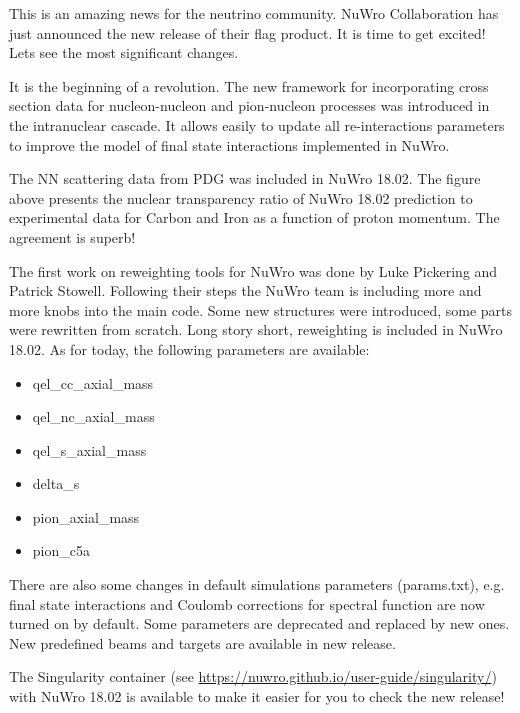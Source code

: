 \documentclass{article}
\begin{document}
\begin{multicols}{3}{

This is an amazing news for the neutrino community. NuWro Collaboration has just announced the new release of their flag product. It is time to get excited! Lets see the most significant changes.

\closearticle


It is the beginning of a revolution. The new framework for incorporating cross section data for nucleon-nucleon and pion-nucleon processes was introduced in the intranuclear cascade. It allows easily to update all re-interactions parameters to improve the model of final state interactions implemented in NuWro.

The NN scattering data from PDG was included in NuWro 18.02. The figure above presents the nuclear transparency ratio of NuWro 18.02 prediction to experimental data for Carbon and Iron as a function of proton momentum. The agreement is superb!


The first work on reweighting tools for NuWro was done by Luke Pickering and Patrick Stowell. Following their steps the NuWro team is including more and more knobs into the main code. Some new structures were introduced, some parts were rewritten from scratch. Long story short, reweighting is included in NuWro 18.02. As for today, the following parameters are available:

\begin{itemize}
 \item {\sc qel\_cc\_axial\_mass}
 \item {\sc qel\_nc\_axial\_mass}
 \item {\sc qel\_s\_axial\_mass}
 \item {\sc delta\_s}
 \item {\sc pion\_axial\_mass}
 \item {\sc pion\_c5a}
\end{itemize}


There are also some changes in default simulations parameters ({\sc params.txt}), e.g. final state interactions and Coulomb corrections for spectral function are now turned on by default. Some parameters are deprecated and replaced by new ones. New predefined beams and targets are available in new release.

The Singularity container (see \url{https://nuwro.github.io/user-guide/singularity/}) with NuWro 18.02 is available to make it easier for you to check the new release!

\closearticle

}\end{multicols}
\end{document}
